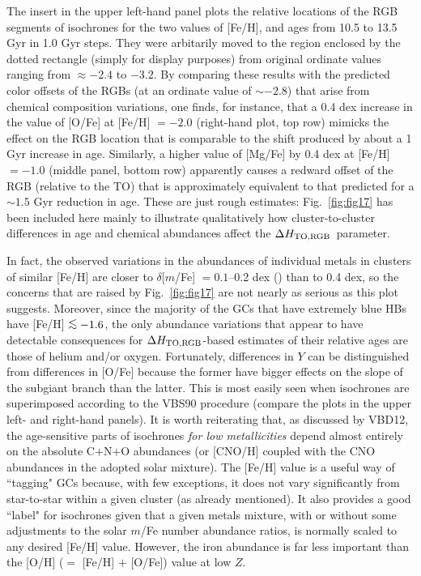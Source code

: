 \documentclass[12pt,preprint]{aastex}
\newcommand\delc{\Delta H_{\rm TO,RGB}}
\newcommand\lta{\mathrel{\hbox{\raise 0.6 ex \hbox{$<$}\kern
                   -1.8 ex\lower .5 ex\hbox{$\sim$}}}}
\begin{document}
The insert in the upper left-hand panel plots the relative locations of the RGB
segments of isochrones for the two values of [Fe/H], and ages from 10.5 to 13.5
Gyr in 1.0 Gyr steps.  They were arbitarily moved to the region enclosed by the
dotted rectangle (simply for display purposes) from original ordinate values
ranging from $\approx -2.4$ to $-3.2$.  By comparing these results with the
predicted color offsets of the RGBs (at an ordinate value of $\sim -2.8$) that
arise from chemical composition variations, one finds, for instance, that a 0.4
dex increase in the value of [O/Fe] at [Fe/H] $= -2.0$ (right-hand plot, top
row) mimicks the effect on the RGB location that is comparable to the shift
produced by about a 1 Gyr increase in age.  Similarly, a higher value of
[Mg/Fe] by 0.4 dex at [Fe/H] $= -1.0$ (middle panel, bottom row) apparently
causes a redward offset of the RGB (relative to the TO) that is approximately
equivalent to that predicted for a $\sim 1.5$ Gyr reduction in age.  These are
just rough estimates: Fig.~\ref{fig:fig17} has been included here mainly to
illustrate qualitatively how cluster-to-cluster differences in age and chemical
abundances affect the $\delc$\ parameter.

In fact, the observed variations in the abundances of individual metals in
clusters of similar [Fe/H] are closer to $\delta$[$m$/Fe] $= 0.1$--0.2 dex
(\citealt{cbg09b}) than to 0.4 dex, so the concerns that are raised by
Fig.~\ref{fig:fig17} are not nearly as serious as this plot suggests.  Moreover,
since the majority of the GCs that have extremely blue HBs have [Fe/H] $\lta
-1.6$, the only abundance variations that appear to have detectable consequences
for $\delc$-based estimates of their relative ages are those of helium and/or
oxygen.  Fortunately, differences in $Y$ can be distinguished from differences
in [O/Fe] because the former have bigger effects on the slope of the subgiant
branch than the latter.  This is most easily seen when isochrones are
superimposed according to the VBS90 procedure (compare the plots in the upper
left- and right-hand panels).  It is worth reiterating that, as discussed by
VBD12, the age-sensitive parts of isochrones {\it for low
metallicities} depend almost entirely on the absolute C$+$N$+$O abundances (or
[CNO/H] coupled with the CNO abundances in the adopted solar mixture).  The
[Fe/H] value is a useful way of ``tagging" GCs because, with few exceptions, it
does not vary significantly from star-to-star within a given cluster (as already
mentioned).  It also provides a good ``label" for isochrones given that a given
metals mixture, with or without some adjustments to the solar $m$/Fe number
abundance ratios, is normally scaled to any desired [Fe/H] value.  However, the
iron abundance is far less important than the [O/H] ($=$ [Fe/H] $+$ [O/Fe])
value at low $Z$.
\end{document}
